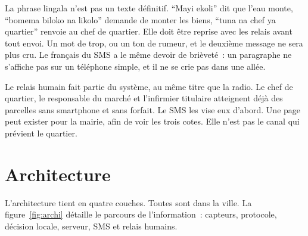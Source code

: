 \documentclass[12pt,a4paper]{article}
\begin{document}
\vspace{0.4em}
La phrase lingala n'est pas un texte définitif. \enquote{Mayi ekoli} dit que l'eau monte, \enquote{bomema biloko na likolo} demande de monter les biens, \enquote{tuna na chef ya quartier} renvoie au chef de quartier. Elle doit être reprise avec les relais avant tout envoi. Un mot de trop, ou un ton de rumeur, et le deuxième message ne sera plus cru. Le français du SMS a le même devoir de brièveté~: un paragraphe ne s'affiche pas sur un téléphone simple, et il ne se crie pas dans une allée.

Le relais humain fait partie du système, au même titre que la radio. Le chef de quartier, le responsable du marché et l'infirmier titulaire atteignent déjà des parcelles sans smartphone et sans forfait. Le SMS les vise eux d'abord. Une page peut exister pour la mairie, afin de voir les trois cotes. Elle n'est pas le canal qui prévient le quartier.

\section{Architecture}
\label{sec:archi}

L'architecture tient en quatre couches. Toutes sont dans la ville. La figure~\ref{fig:archi} détaille le parcours de l'information~: capteurs, protocole, décision locale, serveur, SMS et relais humains.
\end{document}
